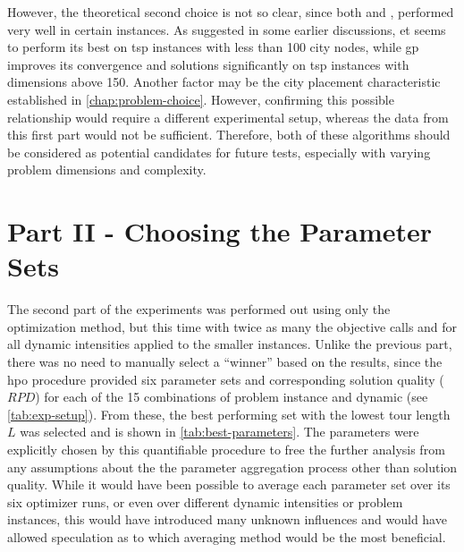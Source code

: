 However, the theoretical second choice is not so clear, since both  and , performed very well in certain instances. As suggested in some earlier discussions, \gls{et} seems to perform its best on \gls{tsp} instances with less than 100 city nodes, while \gls{gp} improves its convergence and solutions significantly on \gls{tsp} instances with dimensions above 150. Another factor may be the city placement characteristic established in \cref{chap:problem-choice}. However, confirming this possible relationship would require a different experimental setup, whereas the data from this first part would not be sufficient. Therefore, both of these algorithms should be considered as potential candidates for future tests, especially with varying problem dimensions and complexity.


\section{Part II - Choosing the Parameter Sets}
\label{chap:part2}

The second part of the experiments was performed out using only the  optimization method, but this time with twice as many the objective calls and for all dynamic intensities applied to the smaller instances. Unlike the previous part, there was no need to manually select a \enquote{winner} based on the results, since the \gls{hpo} procedure provided six parameter sets and corresponding solution quality ($RPD$) for each of the 15 combinations of problem instance and dynamic (see \cref{tab:exp-setup}). From these, the best performing set with the lowest tour length $L$ was selected and is shown in \cref{tab:best-parameters}. The parameters were explicitly chosen by this quantifiable procedure to free the further analysis from any assumptions about the the parameter aggregation process other than solution quality. While it would have been possible to average each parameter set over its six optimizer runs, or even over different dynamic intensities or problem instances, this would have introduced many unknown influences and would have allowed speculation as to which averaging method would be the most beneficial.

